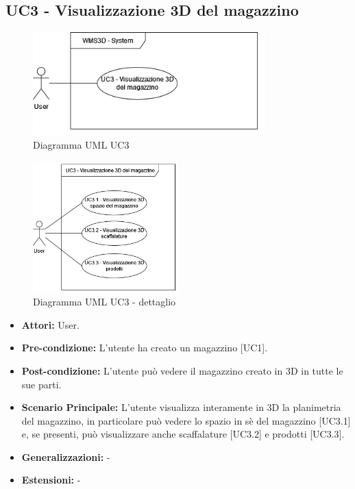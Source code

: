 \subsection{UC3 - Visualizzazione 3D del magazzino}
\begin{figure}[H]
  \centering
  \includegraphics[width=0.8\textwidth]{UC_diagrams_1-10/UC3_sys.drawio.png}
   \caption{Diagramma UML UC3}
\end{figure}
\begin{figure}[H]
  \centering
  \includegraphics[width=0.5\textwidth]{UC_diagrams_1-10/UC3.drawio.png}
   \caption{Diagramma UML UC3 - dettaglio}
\end{figure}
\begin{itemize}
    \item \textbf{Attori:} User.
    \item \textbf{Pre-condizione:}  L'utente ha creato un magazzino [UC1].
    \item \textbf{Post-condizione:} L'utente può vedere il magazzino creato in 3D in tutte le sue parti.
    \item \textbf{Scenario Principale:}  L'utente visualizza interamente in 3D la planimetria del magazzino, in particolare può vedere lo spazio in sè del magazzino [UC3.1] e, se presenti, può visualizzare anche scaffalature [UC3.2] e prodotti [UC3.3].
    \item \textbf{Generalizzazioni:} -
    \item \textbf{Estensioni:} -
\end{itemize}


